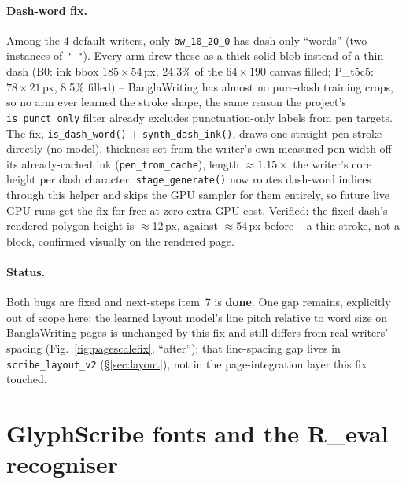 \documentclass[10.5pt,a4paper]{article}
\newcommand{\fp}[1]{\nolinkurl{#1}}
\begin{document}
\paragraph{Dash-word fix.} Among the 4 default writers, only \fp{bw\_10\_20\_0} has dash-only ``words'' (two instances of
\texttt{"-"}). Every arm drew these as a thick solid blob instead of a thin dash (B0: ink bbox $185{\times}54$\,px, 24.3\%
of the $64{\times}190$ canvas filled; P\_t5c5: $78{\times}21$\,px, 8.5\% filled) -- BanglaWriting has almost no pure-dash
training crops, so no arm ever learned the stroke shape, the same reason the project's \texttt{is\_punct\_only} filter
already excludes punctuation-only labels from pen targets. The fix, \texttt{is\_dash\_word()} + \texttt{synth\_dash\_ink()},
draws one straight pen stroke directly (no model), thickness set from the writer's own measured pen width off its
already-cached ink (\texttt{pen\_from\_cache}), length $\approx1.15\times$ the writer's core height per dash character.
\texttt{stage\_generate()} now routes dash-word indices through this helper and skips the GPU sampler for them entirely, so
future live GPU runs get the fix for free at zero extra GPU cost. Verified: the fixed dash's rendered polygon height is
$\approx$12\,px, against $\approx$54\,px before -- a thin stroke, not a block, confirmed visually on the rendered page.

\paragraph{Status.} Both bugs are fixed and next-steps item~7 is \textbf{done}. One gap remains, explicitly out of scope
here: the learned layout model's line pitch relative to word size on BanglaWriting pages is unchanged by this fix and
still differs from real writers' spacing (Fig.~\ref{fig:pagescalefix}, ``after''); that line-spacing gap lives in
\fp{scribe_layout_v2} (\S\ref{sec:layout}), not in the page-integration layer this fix touched.

\section{GlyphScribe fonts and the R\_eval recogniser}
\label{sec:fonts}
\end{document}
